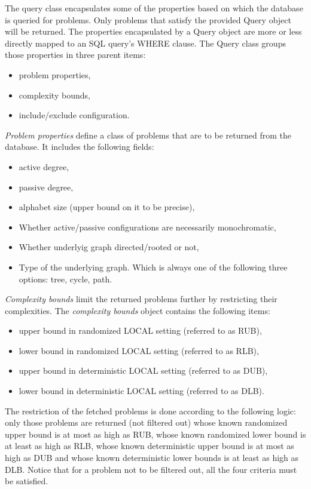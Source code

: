 The query class encapsulates some of the properties
based on which the database is queried for problems.
Only problems that satisfy the provided Query object will be
returned. The properties encapsulated by a Query object are
more or less directly mapped to an SQL query's WHERE clause.
The Query class groups those properties in three parent items:

\begin{itemize}
  \item problem properties,
  \item complexity bounds,
  \item include/exclude configuration.
\end{itemize}

\emph{Problem properties} define a class of problems that are to be
returned from the database. It includes the following fields:

\begin{itemize}
  \item active degree,
  \item passive degree,
  \item alphabet size (upper bound on it to be precise),
  \item Whether active/passive configurations are necessarily monochromatic,
  \item Whether underlyig graph directed/rooted or not,
  \item Type of the underlying graph. Which is always one of the following three
  options: tree, cycle, path.
\end{itemize}

\emph{Complexity bounds} limit the returned problems further by
restricting their complexities. The \emph{complexity bounds} object
contains the following items:

\begin{itemize}
  \item upper bound in randomized LOCAL setting (referred to as RUB),
  \item lower bound in randomized LOCAL setting (referred to as RLB),
  \item upper bound in deterministic LOCAL setting (referred to as DUB),
  \item lower bound in deterministic LOCAL setting (referred to as DLB).
\end{itemize}

The restriction of the fetched problems is done according to the
following logic: only those problems are returned (not filtered out)
whose known randomized upper bound is at most as high as RUB, whose
known randomized lower bound is at least as high as RLB, whose
known deterministic upper bound is at most as high as DUB and whose
known deterministic lower bounds is at least as high as DLB. Notice that
for a problem not to be filtered out, all the four criteria must be
satisfied.

